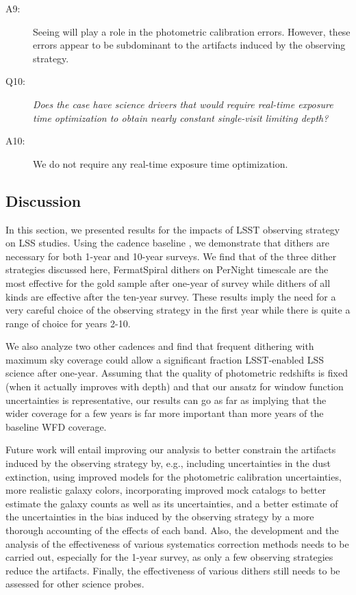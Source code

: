 \begin{description}
\item[A9:] Seeing will play a role in the photometric calibration
errors. However, these errors appear to be subdominant to the artifacts
induced by the observing strategy.

\item[Q10:] {\it Does the case have science drivers that would require
real-time exposure time optimization to obtain nearly constant
single-visit limiting depth?}

\item[A10:] We do not require any real-time exposure time optimization.

\end{description}

\subsection{Discussion}
\label{sec:\secname:discussion}

In this section, we presented results for the impacts of LSST observing
strategy on LSS studies. Using the \OpSim cadence baseline
, we demonstrate that dithers are necessary
for both 1-year and 10-year surveys. We find that of the three dither strategies
discussed here, FermatSpiral dithers on PerNight  timescale are the most
effective for the gold sample after one-year of survey while  dithers of all kinds
are effective after the ten-year survey. These results imply the need for a very careful
choice of the observing strategy in the first year while there is quite a range of choice 
for years 2-10.

We also analyze two other cadences and find  that frequent dithering with
maximum  sky coverage could allow a significant  fraction LSST-enabled LSS
science after  one-year. Assuming that the quality of photometric redshifts is
fixed (when it actually improves with depth) and that our ansatz for window
function uncertainties is representative,  our results can go as far as implying
that the wider coverage for a few years is far more important than more years of the
baseline  WFD coverage.

Future work will entail improving our analysis to better constrain the
artifacts induced by the observing strategy by, e.g., including
uncertainties in the dust extinction, using improved models for the
photometric calibration uncertainties, more realistic galaxy colors,
incorporating improved mock catalogs to better estimate the galaxy
counts as well as its uncertainties, and a better estimate of the
uncertainties in the bias induced by the observing strategy by a more thorough accounting of the
effects of each band. Also, the development and the analysis of the
effectiveness of various systematics correction methods needs to be
carried out, especially for the 1-year survey, as only a few observing 
strategies reduce the artifacts. Finally, the effectiveness
of various dithers still needs to be assessed for other science probes.


